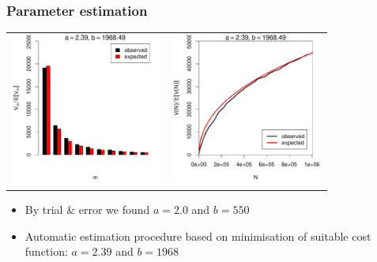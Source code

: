 \documentclass[handout,notes=show,t]{beamer} %
\begin{document}
\begin{frame}[c]
  \frametitle{Parameter estimation}

  \begin{center}
    \begin{tabular}{c @{} c}
      \includegraphics[width=50mm]{img/05-estimation-spc-estimated} &
      \includegraphics[width=50mm]{img/05-estimation-vgc-estimated} 
    \end{tabular}
  \end{center}

  \ungap[1]
  \begin{itemize}
    \item By trial \& error we found $a=2.0$ and $b=550$
    \item Automatic estimation procedure based on minimisation of suitable cost function: $a=2.39$ and $b=1968$
  \end{itemize}
\end{frame}
\end{document}
